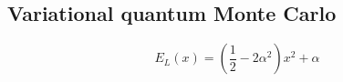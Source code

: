 \documentclass[twocolumn]{article}
\begin{document}
\begin{large}
\section*{Variational quantum Monte Carlo}
\begin{equation}
    E_L(x) = \left(\frac{1}{2}-2\alpha^2\right)x^2 + \alpha
\end{equation}
\end{large}
\end{document}
